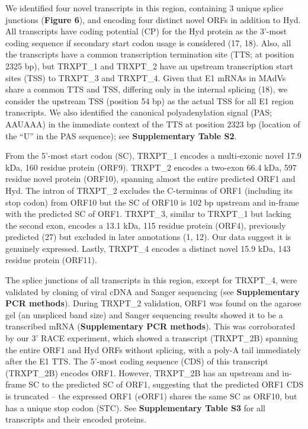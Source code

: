\documentclass[
]{article}
\begin{document}
We identified four novel transcripts in this region, containing 3 unique
splice junctions (\textbf{Figure 6}), and encoding four distinct novel
ORFs in addition to Hyd. All transcripts have coding potential (CP) for
the Hyd protein as the 3'-most coding sequence if secondary start codon
usage is considered (17, 18). Also, all the transcripts have a common
transcription termination site (TTS; at position 2325 bp), but TRXPT\_1
and TRXPT\_2 have an upstream transcription start sites (TSS) to
TRXPT\_3 and TRXPT\_4. Given that E1 mRNAs in MAdVs share a common TTS
and TSS, differing only in the internal splicing (18), we consider the
upstream TSS (position 54 bp) as the actual TSS for all E1 region
transcripts. We also identified the canonical polyadenylation signal
(PAS; AAUAAA) in the immediate context of the TTS at position 2323 bp
(location of the ``U'' in the PAS sequence); see \textbf{Supplementary
Table S2}.

From the 5'-most start codon (SC), TRXPT\_1 encodes a multi-exonic novel
17.9 kDa, 160 residue protein (ORF9). TRXPT\_2 encodes a two-exon 66.4
kDa, 597 residue novel protein (ORF10), spanning almost the entire
predicted ORF1 and Hyd. The intron of TRXPT\_2 excludes the C-terminus
of ORF1 (including its stop codon) from ORF10 but the SC of ORF10 is 102
bp upstream and in-frame with the predicted SC of ORF1. TRXPT\_3,
similar to TRXPT\_1 but lacking the second exon, encodes a 13.1 kDa, 115
residue protein (ORF4), previously predicted (27) but excluded in later
annotations (1, 12). Our data suggest it is genuinely expressed. Lastly,
TRXPT\_4 encodes a distinct novel 15.9 kDa, 143 residue protein (ORF11).

The splice junctions of all transcripts in this region, except for
TRXPT\_4, were validated by cloning of viral cDNA and Sanger sequencing
(see \textbf{Supplementary PCR methods}). During TRXPT\_2 validation,
ORF1 was found on the agarose gel (an unspliced band size) and Sanger
sequencing results showed it to be a transcribed mRNA
(\textbf{Supplementary PCR methods}). This was corroborated by our 3'
RACE experiment, which showed a transcript (TRXPT\_2B) spanning the
entire ORF1 and Hyd ORFs without splicing, with a poly-A tail
immediately after the E1 TTS. The 5'-most coding sequence (CDS) of this
transcript (TRXPT\_2B) encodes ORF1. However, TRXPT\_2B has an upstream
and in-frame SC to the predicted SC of ORF1, suggesting that the
predicted ORF1 CDS is truncated -- the expressed ORF1 (eORF1) shares the
same SC as ORF10, but has a unique stop codon (STC). See
\textbf{Supplementary Table S3} for all transcripts and their encoded
proteins.
\end{document}
